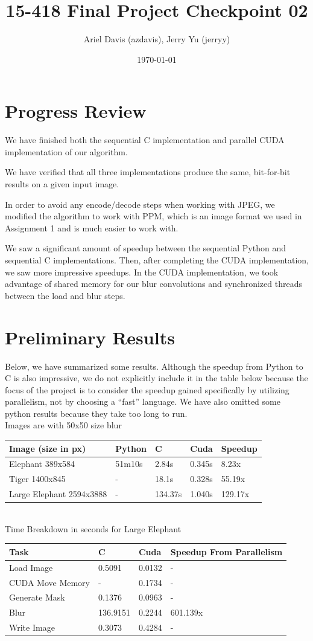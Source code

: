 \documentclass[12pt]{article}
\author{Ariel Davis (azdavis), Jerry Yu (jerryy)}
\date{\today}
\title{15-418 Final Project Checkpoint 02}
\begin{document}
\maketitle

\section{Progress Review}

We have finished both the sequential C implementation and parallel CUDA
implementation of our algorithm.

We have verified that all three implementations produce the same, bit-for-bit
results on a given input image.

In order to avoid any encode/decode steps when working with JPEG, we modified
the algorithm to work with PPM, which is an image format we used in Assignment
1 and is much easier to work with.

We saw a significant amount of speedup between the sequential Python and
sequential C implementations. Then, after completing the CUDA implementation,
we saw more impressive speedups. In the CUDA implementation, we took advantage
of shared memory for our blur convolutions and synchronized threads between
the load and blur steps.

\section{Preliminary Results}

Below, we have summarized some results. Although the speedup from Python to C
is also impressive, we do not explicitly include it in the table below because
the focus of the project is to consider the speedup gained specifically by
utilizing parallelism, not by choosing a ``fast'' language. We have also
omitted some python results because they take too long to run.
\\
Images are with 50x50 size blur \\
\begin{tabular}{l|l|l|l|l}
    Image (size in px) & Python & C & Cuda & Speedup \\
    \hline
    Elephant 389x584 & 51m10s & 2.84s & 0.345s & 8.23x \\
    Tiger 1400x845 & - & 18.1s & 0.328s & 55.19x \\
    Large Elephant 2594x3888 & - & 134.37s & 1.040s & 129.17x \\
\end{tabular}
\\
Time Breakdown in seconds for Large Elephant \\
\begin{tabular}{l|l|l|l}
    Task & C & Cuda & Speedup From Parallelism\\
    \hline
    Load Image & 0.5091 & 0.0132 & - \\
    CUDA Move Memory & - & 0.1734 & - \\
    Generate Mask & 0.1376 & 0.0963 & - \\
    Blur & 136.9151 & 0.2244 & 601.139x \\
    Write Image & 0.3073 & 0.4284 & -
\end{tabular}
\end{document}
